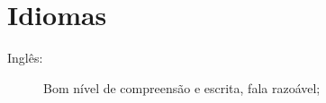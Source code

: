 \documentclass[pdftex, a4paper, 11pt]{article}
\begin{document}

\section*{Idiomas}
\begin{description}
\item[Inglês:] Bom nível de compreensão e escrita, fala razoável;
\end{description}


\vfill


\vspace{1cm}

\end{document}

